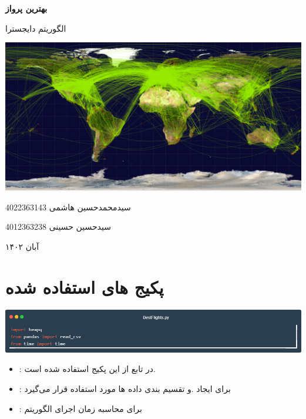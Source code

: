 \documentclass[12pt, dvipsnames, svgnames, x11names,]{article}
\begin{document}
	\begin{titlepage}
		\centering
		\vspace{1cm}
		{\Huge {\textbf{بهترین پرواز}}\par}
		\vspace{15mm}
		{\Large  الگوریتم دایجسترا } \par
		\vspace{16mm}
		\includegraphics[width=14cm]{images/openflights-routedb} \par
		\vfill \par	\vfill
		\vspace{16mm}
		{\normalsize	سیدمحمدحسین هاشمی  4022363143 \par}
		
		{\normalsize	سیدحسین حسینی  4012363238 \par}
		\vspace{1cm}
		{\large آبان ۱۴۰۲\par}
	\end{titlepage}
	\tableofcontents
	\newpage
	
	
	\section{پکیج های استفاده شده}
	
		{\includegraphics[width=14cm]{images/libraries}}
			
		\begin{itemize}
				
			\item 
				{\Large {}:}
				{\small در تابع  از این پکیج استفاده شده است.}
				
			\item 
				{\Large {}:}
				{\small برای ایجاد  .و تقسیم بندی داده ها مورد استفاده قرار می‌گیرد}
				
			\item 
				{\Large {}:}
				{\small برای محاسبه زمان اجرای الگوریتم}

		\end{itemize}
			
\end{document}
